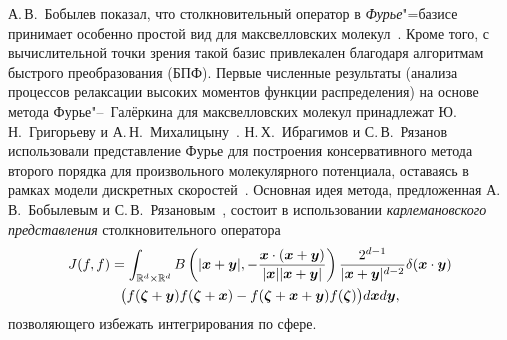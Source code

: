 А.\,В.~Бобылев показал, что столкновительный оператор в \emph{Фурье}"=базисе принимает
особенно простой вид для максвелловских молекул~\cite{Bobylev1975}.
Кроме того, с вычислительной точки зрения такой базис привлекален
благодаря алгоритмам быстрого преобразования (БПФ).
Первые численные результаты (анализа процессов релаксации высоких моментов функции распределения)
на основе метода Фурье"--~Галёркина для максвелловских молекул
принадлежат Ю.\,Н.~Григорьеву и А.\,Н.~Михалицыну~\cite{Grigoriev1983}.
Н.\,Х.~Ибрагимов и С.\,В.~Рязанов использовали представление Фурье
для построения консервативного метода второго порядка для произвольного молекулярного потенциала,
оставаясь в рамках модели дискретных скоростей~\cite{Ibragimov2002}.
Основная идея метода, предложенная А.\,В.~Бобылевым и С.\,В.~Рязановым~\cite{Rjasanow1999},
состоит в использовании \emph{карлемановского представления} столкновительного оператора
\begin{multline}\label{eq:Carleman_representation}
    J(f,f) = \int_{\mathbb{R}^d\times\mathbb{R}^d} B\left(|{\boldsymbol{x}}+{\boldsymbol{y}}|, -\frac{{\boldsymbol{x}}\cdot({\boldsymbol{x}}+{\boldsymbol{y}})}{|{\boldsymbol{x}}||{\boldsymbol{x}}+{\boldsymbol{y}}|}\right)
        \frac{2^{d-1}}{|{\boldsymbol{x}}+{\boldsymbol{y}}|^{d-2}} \delta({\boldsymbol{x}}\cdot{\boldsymbol{y}}) \\
    \big( f({\boldsymbol{\zeta}}+{\boldsymbol{y}})f({\boldsymbol{\zeta}}+{\boldsymbol{x}}) - f({\boldsymbol{\zeta}}+{\boldsymbol{x}}+{\boldsymbol{y}})f({\boldsymbol{\zeta}}) \big) d{\boldsymbol{x}}d{\boldsymbol{y}},
\end{multline}
позволяющего избежать интегрирования по сфере.

